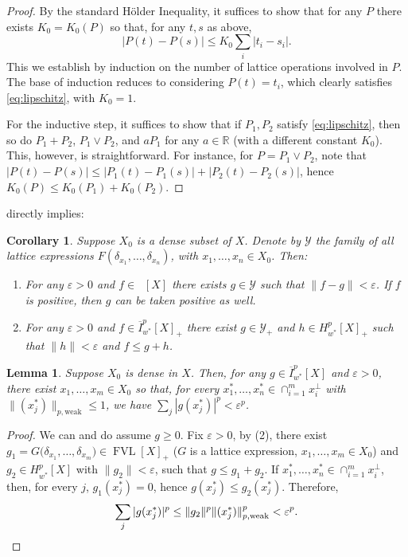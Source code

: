 \documentclass{amsart}
\theoremstyle{plain}
\newtheorem{corollary}[theorem]{Corollary}
\newtheorem{lemma}[theorem]{Lemma}
\theoremstyle{definition}
\numberwithin{equation}{section}
\newcommand{\R}{\mathbb{R}}
\newcommand{\vr}{\varepsilon}
\DeclareMathOperator{\FVL}{FVL}
\DeclareMathOperator{\FBLp}{FBL^{\mathit{(p)}}}
\newcommand{\Hp}{H_{w^*}^{p}}
\newcommand{\nip}{I_{w^*}^{p}}
\newcommand{\Ip}{\overline{I}_{w^*}^{p}}
\begin{document}
\begin{proof}
 By the standard H\"older Inequality, it suffices to show that for any $P$ there exists $K_0 = K_0(P)$ so that, for any $t,s$ as above, 
 \begin{equation}
  |P(t) - P(s)| \leq K_0 \sum_i |t_i - s_i| .
  \label{eq:lipschitz}
 \end{equation}
 This we establish by induction on the number of lattice operations involved in $P$.
 The base of induction reduces to considering $P(t) = t_i$, which clearly satisfies \eqref{eq:lipschitz}, with $K_0 = 1$.
 
 For the inductive step, it suffices to show that if $P_1, P_2$ satisfy \eqref{eq:lipschitz}, then so do $P_1 + P_2$, $P_1 \vee P_2$, and $a P_1$ for any $a \in \R$ (with a different constant $K_0$). This, however, is straightforward. For instance, for $P = P_1 \vee P_2$, note that $|P(t) - P(s)| \leq |P_1(t) - P_1(s)| + |P_2(t) - P_2(s)|$, hence $K_0(P) \leq K_0(P_1) + K_0(P_2)$.
\end{proof}

 directly implies:

\begin{corollary}\label{approximation}
Suppose $X_0$ is a dense subset of $X$. Denote by $\mathcal Y$ the family of all lattice expressions $F(\delta_{x_1}, \ldots, \delta_{x_n})$, with $x_1, \ldots, x_n \in X_0$. Then:
\begin{enumerate}
\item For any $\vr > 0$ and $f \in \FBLp[X]$ there exists $g \in \mathcal Y$ such that $\|f-g\| < \vr$. If $f$ is positive, then $g$ can be taken positive as well.
\item For any $\vr > 0$ and $f \in \Ip[X]_+$ there exist $g \in {\mathcal Y}_+$ and $h \in \Hp[X]_+$ such that $\|h\| < \vr$ and $f \leq g+h$.
\end{enumerate}
\end{corollary}

\begin{lemma}\label{go far to get nothing}
Suppose $X_0$ is dense in $X$. Then, for any $g \in \Ip[X]$ and $\vr > 0$, there exist $x_1, \ldots, x_m \in X_0$ so that, for every $x_1^*, \ldots, x_n^* \in \cap_{i=1}^m x_i^\perp$ with $\|(x_j^*)\|_{p,\textrm{weak}} \leq 1$, we have $\sum_j |g(x_j^*)|^p < \vr^p$.
\end{lemma}

\begin{proof}
We can and do assume $g \geq 0$. Fix $\vr > 0$, %
by (2), there exist $g_1 = G\big(\delta_{x_1}, \ldots, \delta_{x_m}\big) \in \FVL[X]_+$ ($G$ is a lattice expression, $x_1, \ldots, x_m \in X_0$) and $g_2 \in \Hp[X]$ with $\|g_2\| < \vr$, such that $g \leq g_1 + g_2$. %
If $x_1^*, \ldots, x_n^* \in \cap_{i=1}^m x_i^\perp$, then, for every $j$, $g_1(x_j^*) = 0$, hence $g(x_j^*) \leq g_2(x_j^*)$. Therefore,
$$
\sum_j |g(x_j^*)|^p \leq \|g_2\|^p \|(x_j^*)\|_{p,\textrm{weak}}^p < \vr^p . \qedhere
$$
\end{proof}
\end{document}
